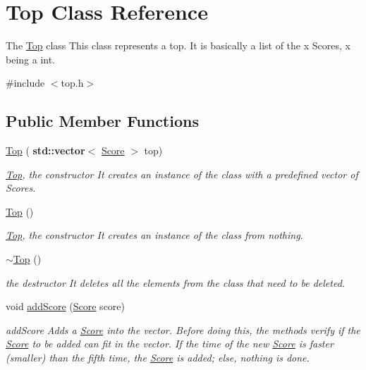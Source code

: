 \hypertarget{class_top}{}\section{Top Class Reference}
\label{class_top}


The \hyperlink{class_top}{Top} class This class represents a top. It is basically a list of the x Scores, x being a int.  




{\ttfamily \#include $<$top.\+h$>$}

\subsection*{Public Member Functions}
\begin{DoxyCompactItemize}
\item 
\hyperlink{class_top_a34354b5614915b4001460886cb0f9350}{Top} (\textbf{ std\+::vector}$<$ \hyperlink{class_score}{Score} $>$ top)
\begin{DoxyCompactList}\small\item\em \hyperlink{class_top}{Top}, the constructor It creates an instance of the class with a predefined vector of Scores. \end{DoxyCompactList}\item 
\mbox{\label{class_top_a1f4fdbd54e6af309245c4a2126ec7775}} 
\hyperlink{class_top_a1f4fdbd54e6af309245c4a2126ec7775}{Top} ()
\begin{DoxyCompactList}\small\item\em \hyperlink{class_top}{Top}, the constructor It creates an instance of the class from nothing. \end{DoxyCompactList}\item 
\mbox{\label{class_top_af6ef9a3be4a4dece0bd073676c7357d6}} 
\hyperlink{class_top_af6ef9a3be4a4dece0bd073676c7357d6}{$\sim$\+Top} ()
\begin{DoxyCompactList}\small\item\em the destructor It deletes all the elements from the class that need to be deleted. \end{DoxyCompactList}\item 
void \hyperlink{class_top_a66039146b2d0a09171048facdb9a32d0}{add\+Score} (\hyperlink{class_score}{Score} score)
\begin{DoxyCompactList}\small\item\em add\+Score Adds a \hyperlink{class_score}{Score} into the vector. Before doing this, the methods verify if the \hyperlink{class_score}{Score} to be added can fit in the vector. If the time of the new \hyperlink{class_score}{Score} is faster (smaller) than the fifth time, the \hyperlink{class_score}{Score} is added; else, nothing is done. \end{DoxyCompactList}\item 

\end{DoxyCompactItemize}
